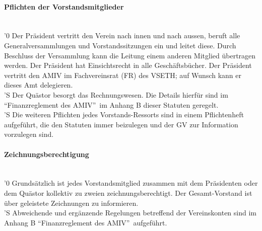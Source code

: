 \documentclass[a4paper,11pt]{article}
\newcommand{\nl}{\\[1.5ex]}
\begin{document}
\paragraph{Pflichten der Vorstandsmitglieder} \ \\
'0 Der Präsident vertritt den Verein nach innen und nach aussen, beruft alle Generalversammlungen und Vorstandssitzungen ein und leitet diese. Durch Beschluss der Versammlung kann die Leitung einem anderen Mitglied übertragen werden. Der Präsident hat Einsichtsrecht in alle Geschäftsbücher. Der Präsident vertritt den AMIV im Fachvereinsrat (FR) des VSETH; auf Wunsch kann er dieses Amt delegieren.\nl
'S Der Quästor besorgt das Rechnungswesen. Die Details hierfür sind im ``Finanzreglement des AMIV''\ im Anhang B dieser Statuten geregelt.\nl
'S Die weiteren Pflichten jedes Vorstands-Ressorts sind in einem Pflichtenheft aufgeführt, die den Statuten immer beizulegen und der GV zur Information vorzulegen sind.


\paragraph{Zeichnungsberechtigung} \ \\
'0 Grundsätzlich ist jedes Vorstandsmitglied zusammen mit dem Präsidenten oder dem Quästor kollektiv zu zweien zeichnungsberechtigt. Der Gesamt-Vorstand ist über geleistete Zeichnungen zu informieren.\nl
'S Abweichende und ergänzende Regelungen betreffend der Vereinskonten sind im Anhang B ``Finanzreglement des AMIV''\ aufgeführt.
\end{document}
